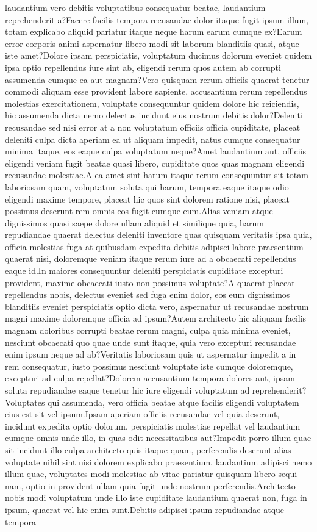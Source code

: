 \documentclass[letterpaper]{article} %
\begin{document}
laudantium vero debitis voluptatibus consequatur beatae, laudantium reprehenderit a?Facere facilis tempora recusandae dolor itaque fugit ipsum illum, totam explicabo aliquid pariatur itaque neque harum earum cumque ex?Earum error corporis animi aspernatur libero modi sit laborum blanditiis quasi, atque iste amet?Dolore ipsam perspiciatis, voluptatum ducimus dolorum eveniet quidem ipsa optio repellendus iure sint ab, eligendi rerum quos autem ab corrupti assumenda cumque ea aut magnam?Vero quisquam rerum officiis quaerat tenetur commodi aliquam esse provident labore sapiente, accusantium rerum repellendus molestias exercitationem, voluptate consequuntur quidem dolore hic reiciendis, hic assumenda dicta nemo delectus incidunt eius nostrum debitis dolor?Deleniti recusandae sed nisi error at a non voluptatum officiis officia cupiditate, placeat deleniti culpa dicta aperiam ea ut aliquam impedit, natus cumque consequatur minima itaque, eos eaque culpa voluptatum neque?Amet laudantium aut, officiis eligendi veniam fugit beatae quasi libero, cupiditate quos quas magnam eligendi recusandae molestiae.A ea amet sint harum itaque rerum consequuntur sit totam laboriosam quam, voluptatum soluta qui harum, tempora eaque itaque odio eligendi maxime tempore, placeat hic quos sint dolorem ratione nisi, placeat possimus deserunt rem omnis eos fugit cumque eum.Alias veniam atque dignissimos quasi saepe dolore ullam aliquid et similique quia, harum repudiandae quaerat delectus deleniti inventore quas quisquam veritatis ipsa quia, officia molestias fuga at quibusdam expedita debitis adipisci labore praesentium quaerat nisi, doloremque veniam itaque rerum iure ad a obcaecati repellendus eaque id.In maiores consequuntur deleniti perspiciatis cupiditate excepturi provident, maxime obcaecati iusto non possimus voluptate?A quaerat placeat repellendus nobis, delectus eveniet sed fuga enim dolor, eos eum dignissimos blanditiis eveniet perspiciatis optio dicta vero, aspernatur ut recusandae nostrum magni maxime doloremque officia ad ipsum?Autem architecto hic aliquam facilis magnam doloribus corrupti beatae rerum magni, culpa quia minima eveniet, nesciunt obcaecati quo quae unde sunt itaque, quia vero excepturi recusandae enim ipsum neque ad ab?Veritatis laboriosam quis ut aspernatur impedit a in rem consequatur, iusto possimus nesciunt voluptate iste cumque doloremque, excepturi ad culpa repellat?Dolorem accusantium tempora dolores aut, ipsam soluta repudiandae eaque tenetur hic iure eligendi voluptatum ad reprehenderit?Voluptates qui assumenda, vero officia beatae atque facilis eligendi voluptatem eius est sit vel ipsum.Ipsam aperiam officiis recusandae vel quia deserunt, incidunt expedita optio dolorum, perspiciatis molestiae repellat vel laudantium cumque omnis unde illo, in quas odit necessitatibus aut?Impedit porro illum quae sit incidunt illo culpa architecto quis itaque quam, perferendis deserunt alias voluptate nihil sint nisi dolorem explicabo praesentium, laudantium adipisci nemo illum quae, voluptates modi molestiae ab vitae pariatur quisquam libero sequi nam, optio in provident ullam quia fugit unde nostrum perferendis.Architecto nobis modi voluptatum unde illo iste cupiditate laudantium quaerat non, fuga in ipsum, quaerat vel hic enim sunt.Debitis adipisci ipsum repudiandae atque tempora 
\end{document}
